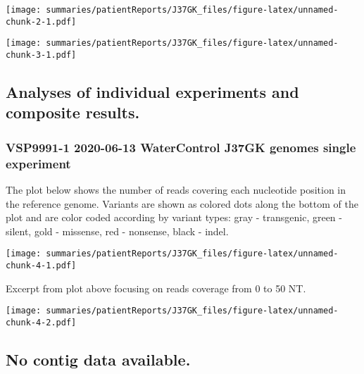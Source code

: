 \documentclass[12pt,]{article}
\begin{document}
\vspace{0.5cm}

\texttt{[image: summaries/patientReports/J37GK\_files/figure-latex/unnamed-chunk-2-1.pdf]}

\newpage

\texttt{[image: summaries/patientReports/J37GK\_files/figure-latex/unnamed-chunk-3-1.pdf]}

\newpage

\subsection{Analyses of individual experiments and composite
results.}\label{analyses-of-individual-experiments-and-composite-results.}

\subsubsection{VSP9991-1 \textbar{} 2020-06-13 \textbar{} WaterControl
\textbar{} J37GK \textbar{} genomes \textbar{} single
experiment}\label{vsp9991-1-2020-06-13-watercontrol-j37gk-genomes-single-experiment}

The plot below shows the number of reads covering each nucleotide
position in the reference genome. Variants are shown as colored dots
along the bottom of the plot and are color coded according by variant
types: gray - transgenic, green - silent, gold - missense, red -
nonsense, black - indel.

\vspace{0.23cm}

\texttt{[image: summaries/patientReports/J37GK\_files/figure-latex/unnamed-chunk-4-1.pdf]}

\vspace{0.35cm}

\vspace{0.25cm} Excerpt from plot above focusing on reads coverage from
0 to 50 NT.

\vspace{0.25cm}

\texttt{[image: summaries/patientReports/J37GK\_files/figure-latex/unnamed-chunk-4-2.pdf]}

\vspace{0.50cm}

\subsection{No contig data available.}\label{no-contig-data-available.}

\vspace{0.50cm}

\newpage

\newpage
\end{document}
